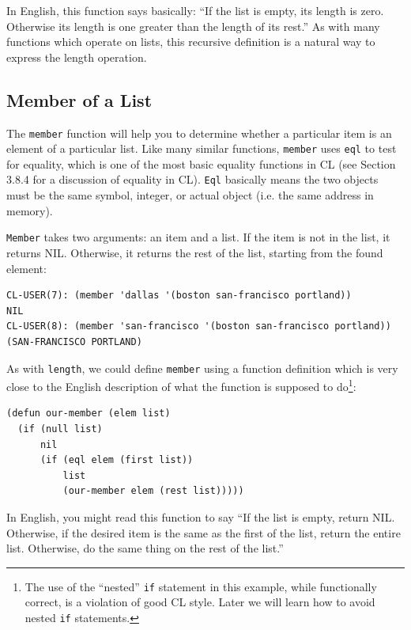 In English, this function says basically: ``If the list is empty, its length is zero. Otherwise
its length is one greater than the length of its rest.'' As with many functions which operate
on lists, this recursive definition is a natural way to express the length operation.

\subsection{Member of a List}

The \texttt{member} function will help you to determine whether a particular item is an element of
a particular list. Like many similar functions, \texttt{member} uses \texttt{eql} to test for equality, which is
one of the most basic equality functions in CL (see Section 3.8.4 for a discussion of equality
in CL). \texttt{Eql} basically means the two objects must be the same symbol, integer, or actual
object (i.e. the same address in memory).

\texttt{Member} takes two arguments: an item and a list. If the item is not in the list, it returns
NIL. Otherwise, it returns the rest of the list, starting from the found element:

\begin{verbatim}
CL-USER(7): (member 'dallas '(boston san-francisco portland))
NIL
CL-USER(8): (member 'san-francisco '(boston san-francisco portland))
(SAN-FRANCISCO PORTLAND)
\end{verbatim}

As with \texttt{length}, we could define \texttt{member} using a function definition which is very close to
the English description of what the function is supposed to do\footnote{The use of the ``nested'' \texttt{if} statement in this example, while functionally correct, is a violation of good
CL style. Later we will learn how to avoid nested \texttt{if} statements.}:

\begin{verbatim}
(defun our-member (elem list)
  (if (null list)
      nil
      (if (eql elem (first list))
          list
          (our-member elem (rest list)))))
\end{verbatim}

In English, you might read this function to say ``If the list is empty, return NIL. Otherwise,
if the desired item is the same as the first of the list, return the entire list. Otherwise, do
the same thing on the rest of the list.''

